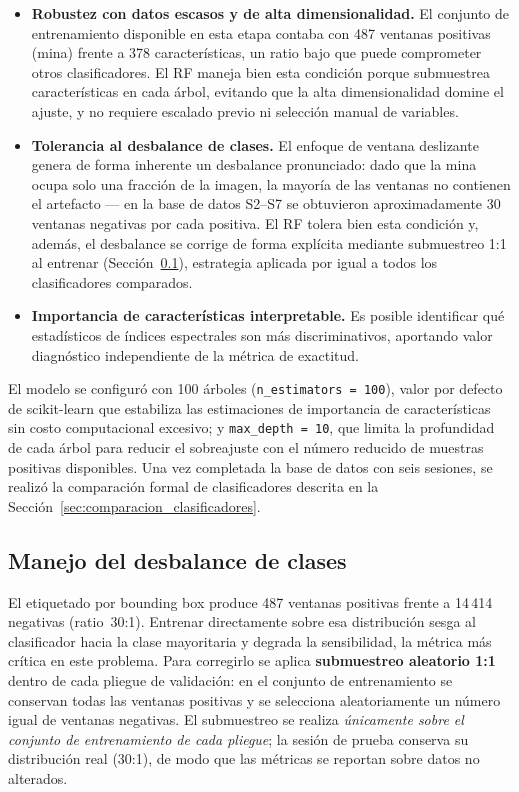 \begin{itemize}
  \item \textbf{Robustez con datos escasos y de alta dimensionalidad.}
    El conjunto de entrenamiento disponible en esta etapa contaba con 487
    ventanas positivas (mina) frente a 378 características, un ratio bajo
    que puede comprometer otros clasificadores. El \ac{RF} maneja bien esta
    condición porque submuestrea características en cada árbol, evitando que
    la alta dimensionalidad domine el ajuste, y no requiere escalado previo
    ni selección manual de variables.
  \item \textbf{Tolerancia al desbalance de clases.} El enfoque de ventana
    deslizante genera de forma inherente un desbalance pronunciado: dado que la
    mina ocupa solo una fracción de la imagen, la mayoría de las ventanas no
    contienen el artefacto --- en la base de datos S2--S7 se obtuvieron
    aproximadamente 30 ventanas negativas por cada positiva. El \ac{RF} tolera
    bien esta condición y, además, el desbalance se corrige de forma explícita
    mediante submuestreo 1:1 al entrenar (Sección~\ref{sec:balanceo}), estrategia
    aplicada por igual a todos los clasificadores comparados.
  \item \textbf{Importancia de características interpretable.} Es posible
    identificar qué estadísticos de índices espectrales son más discriminativos,
    aportando valor diagnóstico independiente de la métrica de exactitud.
\end{itemize}

El modelo se configuró con 100 árboles (\texttt{n\_estimators = 100}),
valor por defecto de scikit-learn que estabiliza las estimaciones de importancia
de características sin costo computacional excesivo; y \texttt{max\_depth = 10},
que limita la profundidad de cada árbol para reducir el sobreajuste con el número
reducido de muestras positivas disponibles. Una vez completada la base de datos
con seis sesiones, se realizó la comparación formal de clasificadores descrita en
la Sección~\ref{sec:comparacion_clasificadores}.



\subsection{Manejo del desbalance de clases}
\label{sec:balanceo}

El etiquetado por bounding box produce 487 ventanas positivas frente a 14\,414
negativas (ratio~30:1). Entrenar directamente sobre esa distribución sesga al
clasificador hacia la clase mayoritaria y degrada la sensibilidad, la métrica más
crítica en este problema. Para corregirlo se aplica \textbf{submuestreo aleatorio
1:1} dentro de cada pliegue de validación: en el conjunto de entrenamiento se
conservan todas las ventanas positivas y se selecciona aleatoriamente un número
igual de ventanas negativas. El submuestreo se realiza \textit{únicamente sobre el
conjunto de entrenamiento de cada pliegue}; la sesión de prueba conserva su
distribución real (30:1), de modo que las métricas se reportan sobre datos no
alterados.

